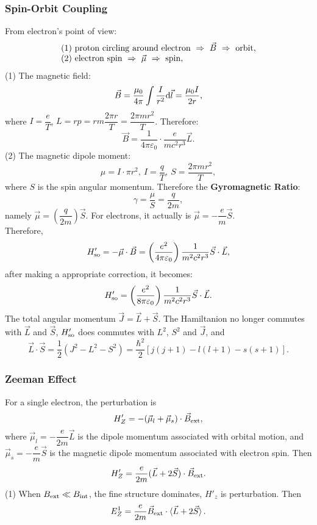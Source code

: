 \documentclass[12pt, 
]{article}
\begin{document}
\subsubsection{Spin-Orbit Coupling}
From electron's point of view:
\[
	\begin{array}{l}
		(1)~{\rm proton~circling~around~electron}~\Rightarrow~\vec{B}~\Rightarrow~{\rm orbit},\\
		(2)~{\rm electron~spin}~\Rightarrow~\vec{\mu}~\Rightarrow~{\rm spin},
	\end{array}
\]
(1) The magnetic field:
\[
	\vec{B}=\frac{\mu_0}{4\pi}\int\frac{I}{r^2}{\rm d}\vec{l}=\frac{\mu_0I}{2r},
\]
where $I=\dfrac{e}{T}$, $L=rp=rm\dfrac{2\pi r}{T}=\dfrac{2\pi m r^2}{T}$. Therefore:
\[
	\vec{B}=\frac{1}{4\pi\varepsilon_0}\cdot\frac{e}{mc^2r^3}\vec{L}.
\]
(2) The magnetic dipole moment:
\[
	\mu=I\cdot\pi r^2, ~I=\frac{q}{T},~S=\frac{2\pi m r^2}{T},
\]
where $S$ is the spin angular momentum. Therefore the {\bf Gyromagnetic Ratio}:
\[
	\gamma=\frac{\mu}{S}=\frac{q}{2m},
\]
namely $\vec{\mu}=\left(\dfrac{q}{2m}\right)\vec{S}$. For electrons, it actually is $\vec{\mu}=-\dfrac{e}{m}\vec{S}$.\\
Therefore,
\begin{eqnarray*}
	H'_{\rm so}=-\vec{\mu}\cdot\vec{B}=\left(\frac{e^2}{4\pi\varepsilon_0}\right)\frac{1}{m^2c^2r^3}\vec{S}\cdot\vec{L},
\end{eqnarray*}
after making a appropriate correction, it becomes:
\[
	H'_{\rm so}=\left(\frac{e^2}{8\pi\varepsilon_0}\right)\frac{1}{m^2c^2r^3}\vec{S}\cdot\vec{L}.
\]
The total angular momentum $\vec{J}=\vec{L}+\vec{S}$. The Hamiltanion no longer commutes with $\vec{L}$ and $\vec{S}$, $H'_{\rm so}$ does commutes with $L^2$, $S^2$ and $\vec{J}$, and 
\[
	\vec{L}\cdot\vec{S}=\frac{1}{2}(J^2-L^2-S^2)=\frac{\hbar^2}{2}[j(j+1)-l(l+1)-s(s+1)].
\]

\subsubsection{Zeeman Effect}
For a single electron, the perturbation is \[
	H'_Z=-(\vec{\mu}_l+\vec{\mu}_s)\cdot\vec{B}_{\rm ext},
\]
where $\vec{\mu}_l=-\dfrac{e}{2m}\vec{L}$ is the dipole momentum associated with orbital motion, and $\vec{\mu}_s=-\dfrac{e}{m}\vec{S}$ is the magnetic dipole momentum associated with electron spin. Then
\[	
	H'_Z=\frac{e}{2m}(\vec{L}+2\vec{S})\cdot\vec{B}_{\rm ext}.
\]
(1) When $B_{\rm ext}\ll B_{\rm int}$, the fine structure dominates, $H'_z$ is perturbation. Then
\[
	E_Z^1=\frac{e}{2m}\vec{B}_{\rm ext}\cdot\braket{\vec{L}+2\vec{S}}.
\]
\end{document}
